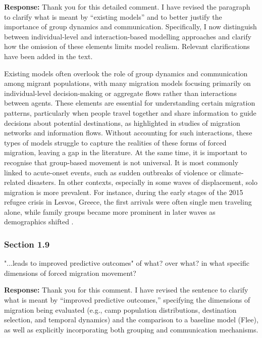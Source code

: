\documentclass[11pt,a4paper]{article}
\begin{document}
\textbf{Response:}
Thank you for this detailed comment. I have revised the paragraph to clarify what is meant by “existing models” and to better justify the importance of group dynamics and communication. Specifically, I now distinguish between individual-level and interaction-based modelling approaches and clarify how the omission of these elements limits model realism. Relevant clarifications have been added in the text.

\vspace{0.5cm}

\begin{updatebox}
Existing models often overlook the role of group dynamics and communication among migrant populations, with many migration models focusing primarily on individual-level decision-making or aggregate flows rather than interactions between agents. These elements are essential for understanding certain migration patterns, particularly when people travel together and share information to guide decisions about potential destinations, as highlighted in studies of migration networks and information flows. Without accounting for such interactions, these types of models struggle to capture the realities of these forms of forced migration, leaving a gap in the literature. At the same time, it is important to recognise that group-based movement is not universal. It is most commonly linked to acute-onset events, such as sudden outbreaks of violence or climate-related disasters. In other contexts, especially in some waves of displacement, solo migration is more prevalent. For instance, during the early stages of the 2015 refugee crisis in Lesvos, Greece, the first arrivals were often single men traveling alone, while family groups became more prominent in later waves as demographics shifted \citep{unhcr_sea_arrivals_2015,crawley2016unpacking}.
\end{updatebox}

\vspace{0.5cm}

\subsubsection*{Section 1.9}

\begin{reviewbox}
"...leads to improved predictive outcomes" of what? over what? in what specific dimensions of forced migration movement?
\end{reviewbox}

\textbf{Response:}
Thank you for this comment. I have revised the sentence to clarify what is meant by “improved predictive outcomes,” specifying the dimensions of migration being evaluated (e.g., camp population distributions, destination selection, and temporal dynamics) and the comparison to a baseline model (Flee), as well as explicitly incorporating both grouping and communication mechanisms.
\end{document}
